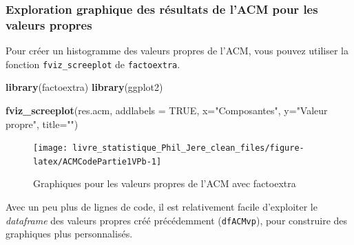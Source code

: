 \documentclass[
  11pt,
  french,
]{book}
\makeatletter
\newenvironment{Shaded}{\begin{snugshade}}{\end{snugshade}}
\newcommand{\DataTypeTok}[1]{\textcolor[rgb]{0.13,0.29,0.53}{#1}}
\newcommand{\KeywordTok}[1]{\textcolor[rgb]{0.13,0.29,0.53}{\textbf{#1}}}
\newcommand{\NormalTok}[1]{#1}
\newcommand{\OtherTok}[1]{\textcolor[rgb]{0.56,0.35,0.01}{#1}}
\newcommand{\StringTok}[1]{\textcolor[rgb]{0.31,0.60,0.02}{#1}}
\newenvironment{kframe}{%
\medskip{}
\setlength{\fboxsep}{.8em}
 \def\at@end@of@kframe{}%
 \ifinner\ifhmode%
  \def\at@end@of@kframe{\end{minipage}}%
  \begin{minipage}{\columnwidth}%
 \fi\fi%
 \def\FrameCommand##1{\hskip\@totalleftmargin \hskip-\fboxsep
 \colorbox{shadecolor}{##1}\hskip-\fboxsep
     \hskip-\linewidth \hskip-\@totalleftmargin \hskip\columnwidth}%
 \MakeFramed {\advance\hsize-\width
   \@totalleftmargin\z@ \linewidth\hsize
   \@setminipage}}%
 {\par\unskip\endMakeFramed%
 \at@end@of@kframe}
\renewenvironment{Shaded}{\begin{kframe}}{\end{kframe}}
\makeatother
\begin{document}
\hypertarget{sect124212}{%
\subsubsection{Exploration graphique des résultats de l'ACM pour les valeurs propres}\label{sect124212}}

Pour créer un histogramme des valeurs propres de l'ACM, vous pouvez utiliser la fonction \texttt{fviz\_screeplot} de \texttt{factoextra}.

\begin{Shaded}
\begin{Highlighting}[]
\KeywordTok{library}\NormalTok{(factoextra)}
\KeywordTok{library}\NormalTok{(ggplot2)}

\KeywordTok{fviz_screeplot}\NormalTok{(res.acm, }\DataTypeTok{addlabels =} \OtherTok{TRUE}\NormalTok{,}
               \DataTypeTok{x=}\StringTok{"Composantes"}\NormalTok{, }\DataTypeTok{y=}\StringTok{"Valeur propre"}\NormalTok{, }\DataTypeTok{title=}\StringTok{""}\NormalTok{)}
\end{Highlighting}
\end{Shaded}

\begin{figure}

{\centering \texttt{[image: livre\_statistique\_Phil\_Jere\_clean\_files/figure-latex/ACMCodePartie1VPb-1]} 

}

\caption{Graphiques pour les valeurs propres de l'ACM avec factoextra}\label{fig:ACMCodePartie1VPb}
\end{figure}

Avec un peu plus de lignes de code, il est relativement facile d'exploiter le \emph{dataframe} des valeurs propres créé précédemment (\texttt{dfACMvp}), pour construire des graphiques plus personnalisés.
\end{document}
